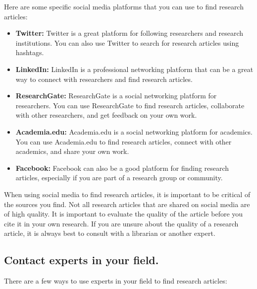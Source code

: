 \documentclass[
  b5paper]{book}
\begin{document}
Here are some specific social media platforms that you can use to find research articles:

\begin{itemize}
\item
  \textbf{Twitter:} Twitter is a great platform for following researchers and research institutions. You can also use Twitter to search for research articles using hashtags.
\item
  \textbf{LinkedIn:} LinkedIn is a professional networking platform that can be a great way to connect with researchers and find research articles.
\item
  \textbf{ResearchGate:} ResearchGate is a social networking platform for researchers. You can use ResearchGate to find research articles, collaborate with other researchers, and get feedback on your own work.
\item
  \textbf{Academia.edu:} Academia.edu is a social networking platform for academics. You can use Academia.edu to find research articles, connect with other academics, and share your own work.
\item
  \textbf{Facebook:} Facebook can also be a good platform for finding research articles, especially if you are part of a research group or community.
\end{itemize}

When using social media to find research articles, it is important to be critical of the sources you find. Not all research articles that are shared on social media are of high quality. It is important to evaluate the quality of the article before you cite it in your own research. If you are unsure about the quality of a research article, it is always best to consult with a librarian or another expert.

\hypertarget{contact-experts-in-your-field.}{%
\subsection*{Contact experts in your field.}\label{contact-experts-in-your-field.}}

There are a few ways to use experts in your field to find research articles:
\end{document}
